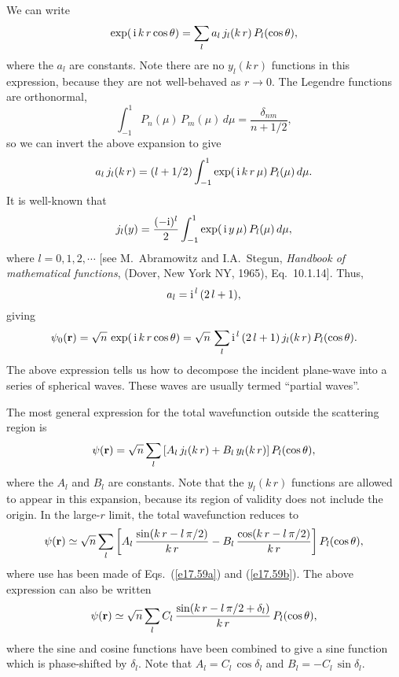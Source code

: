 We can write
\begin{equation}
\exp(\,{\rm i}\,k\,r \cos\theta) = \sum_l a_l\, j_l(k\,r)\, P_l(\cos\theta),
\end{equation}
where the $a_l$ are constants. Note there are no  $y_l(k\,r)$ functions in
this expression, because they are not well-behaved  as $r \rightarrow 0$. 
The Legendre functions are orthonormal,
\begin{equation}\label{e17.61}
\int_{-1}^1 P_n(\mu) \,P_m(\mu)\,d\mu = \frac{\delta_{nm}}{n+1/2},
\end{equation}
so we can invert the above expansion to give
\begin{equation}
a_l \,j_l(k\,r) = (l+1/2)\int_{-1}^1 \exp(\,{\rm i}\,k\,r \,\mu) \,P_l(\mu) \,d\mu.
\end{equation}
It is well-known that
\begin{equation}
j_l(y) = \frac{(-{\rm i})^l}{2} \int_{-1}^1 \exp(\,{\rm i}\, y\,\mu)
\,P_l(\mu)\,d\mu,
\end{equation}
where $l=0, 1, 2, \cdots$ [see M.~Abramowitz and I.A.~Stegun, {\em Handbook of mathematical functions}, (Dover, New York NY, 1965),
Eq.~10.1.14]. Thus,
\begin{equation}
a_l = {\rm i}^{\,l} \,(2\,l+1),
\end{equation}
giving
\begin{equation}\label{e15.49}
\psi_0({\bf r}) = \sqrt{n}\,\exp(\,{\rm i}\,k\,r \cos\theta) =\sqrt{n}\, \sum_l {\rm i}^{\,l}\,(2\,l+1)\, j_l(k\,r)\, P_l(\cos\theta).
\end{equation}
The above expression  tells us how to decompose
the incident plane-wave  into
a series of spherical waves. These waves are usually termed  ``partial waves''.

The most general expression for the total wavefunction outside the
scattering region is
\begin{equation}
\psi({\bf r}) = \sqrt{n}\sum_l\left[
A_l\,j_l(k\,r) + B_l\,y_l(k\,r)\right] P_l(\cos\theta),
\end{equation}
where the $A_l$ and $B_l$ are constants. 
Note that the $y_l(k\,r)$ functions are allowed to appear 
in this expansion, because
its region of validity does not include the origin. In the large-$r$
limit, the total wavefunction reduces to
\begin{equation}
\psi ({\bf r} ) \simeq \sqrt{n} \sum_l\left[A_l\,
\frac{\sin(k\,r - l\,\pi/2)}{k\,r} - B_l\,\frac{\cos(k\,r -l\,\pi/2)}{k\,r}
\right] P_l(\cos\theta),
\end{equation}
where use has been made of Eqs.~(\ref{e17.59a}) and (\ref{e17.59b}). The above expression can also
be written
\begin{equation}\label{e17.68}
\psi ({\bf r} ) \simeq \sqrt{n} \sum_l C_l\,
\frac{\sin(k\,r - l\,\pi/2+ \delta_l)}{k\,r}\, P_l(\cos\theta),
\end{equation}
where the sine and cosine functions have been combined to give a
sine function which is phase-shifted by $\delta_l$. Note that $A_l=C_l\,\cos\delta_l$ and $B_l=-C_l\,\sin\delta_l$.


